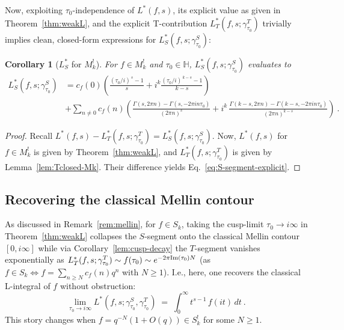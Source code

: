 \documentclass[11pt]{article}
\newtheorem{corollary}[theorem]{Corollary}
\newcommand{\HH}{\mathbb{H}}
\begin{document}
Now, exploiting $\tau_0$-independence of $L^*(f, s)$, its explicit value as given in 
Theorem~\ref{thm:weakL}, and the explicit T-contribution $L^*_T(f, s; \gamma^T_{\tau_0})$ trivially 
implies clean, closed-form expressions for $L^*_S(f, s; \gamma^S_{\tau_0})$:

\begin{corollary}[$L^*_S$ for $M_k^!$]\label{cor:Sclosed}
For $f\in M^!_k$ and $\tau_0\in\HH$, 
$L^*_S(f, s; \gamma^S_{\tau_0})$ evaluates to
\begin{align}
L_S^*(f,s;\gamma^S_{\tau_0})
&= c_f(0)\left(\frac{(\tau_0/i)^{\,s}-1}{s}
+ i^k\frac{(\tau_0/i)^{\,k-s}-1}{k-s}\right) \label{eq:S-segment-explicit}\\
&+ \sum_{n\ne0} c_f(n)\!\left(\frac{\Gamma(s,2\pi n)-\Gamma(s,-2\pi i n\tau_0)}{(2\pi n)^s}
+ i^k\,\frac{\Gamma(k-s,2\pi n)-\Gamma(k-s,-2\pi i n\tau_0)}{(2\pi n)^{k-s}}\right)~. \nonumber
\end{align}
\end{corollary}
\begin{proof}
Recall $L^*(f, s) - L^*_T(f, s; \gamma^T_{\tau_0}) = L^*_S(f, s; \gamma^S_{\tau_0})$. 
Now, $L^*(f,s)$ for $f \in M_k^!$ is given by Theorem~\ref{thm:weakL}, and 
$L^*_T(f, s; \gamma^T_{\tau_0})$ is given by Lemma~\ref{lem:Tclosed-Mk}. 
Their difference yields Eq.~\eqref{eq:S-segment-explicit}.
\end{proof}


\subsection{Recovering the classical Mellin contour}\label{sec:Connection-w-previous-weak-MF-l-functions}

As discussed in Remark~\ref{rem:mellin}, for $f \in S_k$, taking the cusp-limit
$\tau_0 \to i\infty$ in Theorem~\ref{thm:weakL} collapses the $S$-segment 
onto the classical Mellin contour $[0, i\infty]$ while via Corollary~\ref{lem:cusp-decay} 
the $T$-segment vanishes exponentially as $L^*_T(f, s; \gamma^T_{\tau_0}) \sim f(\tau_0) 
\sim e^{-2\pi {\rm Im}(\tau_0) N}$ (as $f \in S_k \Leftrightarrow f = \sum_{n \geq N} c_f(n) q^n$ with $N \geq 1$). 
I.e., here, one recovers the classical L-integral of $f$ without obstruction:
\begin{equation}\label{eq:Mellin-recovery}
\lim_{\tau_0 \to i\infty}\!
L^*(f, s; \gamma^S_{\tau_0}, \gamma^T_{\tau_0})
\;=\; \int_0^\infty\! t^{s - 1}\,f(it)\,dt~.
\end{equation}  
This story changes when $f = q^{-N} (1 + O(q)) \in S_k^!$ for some $N \geq 1$. 
\end{document}

